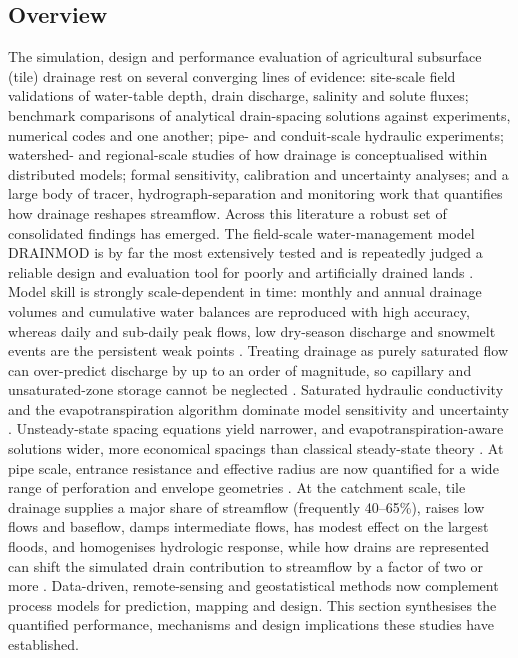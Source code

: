 \subsection{Overview}

The simulation, design and performance evaluation of agricultural subsurface (tile) drainage rest on several converging lines of evidence: site-scale field validations of water-table depth, drain discharge, salinity and solute fluxes; benchmark comparisons of analytical drain-spacing solutions against experiments, numerical codes and one another; pipe- and conduit-scale hydraulic experiments; watershed- and regional-scale studies of how drainage is conceptualised within distributed models; formal sensitivity, calibration and uncertainty analyses; and a large body of tracer, hydrograph-separation and monitoring work that quantifies how drainage reshapes streamflow. Across this literature a robust set of consolidated findings has emerged. The field-scale water-management model \textsc{DRAINMOD} is by far the most extensively tested and is repeatedly judged a reliable design and evaluation tool for poorly and artificially drained lands \parencite{Singh2019b,Gowda2012}. Model skill is strongly scale-dependent in time: monthly and annual drainage volumes and cumulative water balances are reproduced with high accuracy, whereas daily and sub-daily peak flows, low dry-season discharge and snowmelt events are the persistent weak points \parencite{Gowda2012,Dayyani2009,Morrison2014,Varvaris2018}. Treating drainage as purely saturated flow can over-predict discharge by up to an order of magnitude, so capillary and unsaturated-zone storage cannot be neglected \parencite{Xin2016b}. Saturated hydraulic conductivity and the evapotranspiration algorithm dominate model sensitivity and uncertainty \parencite{NabiSichani2012,Malakshahi2020,Wang2006}. Unsteady-state spacing equations yield narrower, and evapotranspiration-aware solutions wider, more economical spacings than classical steady-state theory \parencite{OOSTERBAAN1988,NIKAM1992}. At pipe scale, entrance resistance and effective radius are now quantified for a wide range of perforation and envelope geometries \parencite{Ghane2022,Ghane2022b}. At the catchment scale, tile drainage supplies a major share of streamflow (frequently 40--65\%), raises low flows and baseflow, damps intermediate flows, has modest effect on the largest floods, and homogenises hydrologic response, while how drains are represented can shift the simulated drain contribution to streamflow by a factor of two or more \parencite{King2014,Schilling2008,Sloan2017,BolandBrien2014,Karan2021,Boico2022}. Data-driven, remote-sensing and geostatistical methods now complement process models for prediction, mapping and design. This section synthesises the quantified performance, mechanisms and design implications these studies have established.

